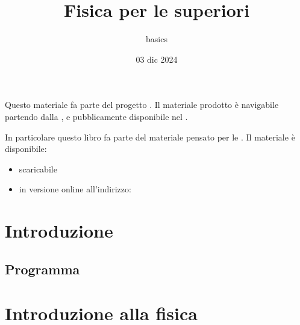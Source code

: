 \documentclass[letterpaper,10pt,italian]{jupyterBook}
\title{Fisica per le superiori}
\date{03 dic 2024}
\author{basics}
\begin{document}
\pagestyle{empty}
\sphinxmaketitle
\pagestyle{plain}
\sphinxtableofcontents
\pagestyle{normal}
\label{\detokenize{intro::doc}}


\sphinxAtStartPar
{}
Questo materiale fa parte del progetto . Il materiale prodotto è navigabile partendo dalla , e pubblicamente disponibile nel .

\sphinxAtStartPar
In particolare questo libro fa parte del materiale pensato per le . Il materiale è disponibile:
\begin{itemize}
\item {} 
\sphinxAtStartPar
{} scaricabile

\item {} 
\sphinxAtStartPar
in versione online all’indirizzo: 

\end{itemize}

\sphinxstepscope


\part{Introduzione}

\sphinxstepscope


\chapter{Programma}
\label{\detokenize{ch/program:programma}}\label{\detokenize{ch/program:physics-hs-program}}\label{\detokenize{ch/program::doc}}
\sphinxstepscope


\part{Introduzione alla fisica}

\sphinxstepscope
\end{document}

